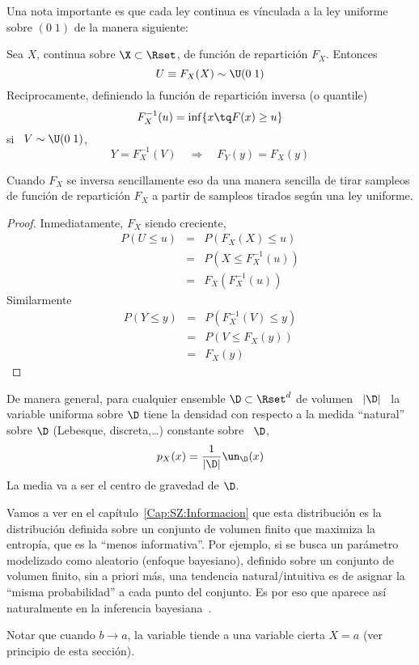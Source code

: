 Una nota  importante es que cada ley  continua es v\'inculada a  la ley uniforme
sobre $(0 \; 1)$ de la manera siguiente:
%
\begin{lema}[Inversi\'on]\label{Lem:MP:InversionUniforme}
Sea $X$, continua sobre $\X \subset \Rset$, de funci\'on de repartici\'on $F_X$. Entonces
%
\[
U \equiv F_X(X) \sim \U(0 \; 1)
\]
%
Reciprocamente, definiendo la funci\'on de repartici\'on inversa (o quantile)
%
\[
F_X^{-1}(u) = \inf \{ x \tq F(x) \ge u \}
\]
%
si \ $V \sim \U( 0 \; 1 )$,
%
\[
Y = F_X^{-1}(V) \quad \Rightarrow \quad F_Y(y) = F_X(y)
\]
\end{lema}
%
Cuando  $F_X$ se  inversa  sencillamente eso  da  una manera  sencilla de  tirar
sampleos de funci\'on de repartici\'on $F_X$ a partir de sampleos tirados seg\'un
una ley uniforme.
%
\begin{proof}
Inmediatamente, $F_X$ siendo creciente,
%
\begin{eqnarray*}
P(U \le u) & = &  P( F_X(X) \le u)\\[2mm]
%
& = & P(X \le F_X^{-1}(u))\\[2mm]
%
& = & F_X\left( F_X^{-1} (u) \right)
\end{eqnarray*}
%
Similarmente
%
\begin{eqnarray*}
P(Y \le y) & = &  P( F_X^{-1}(V) \le y)\\[2mm]
%
& = & P(V \le F_X(y))\\[2mm]
%
& = & F_X(y)
\end{eqnarray*}
%
\end{proof}

De manera  general, para  cualquier ensemble $\D  \subset \Rset^d$ de  volumen \
$|\D|$ \,  la variable uniforma sobre $\D$  tiene la densidad con  respecto a la
medida  ``natural'' sobre  $\D$  (Lebesque, discreta,\ldots)  constante sobre  \
$\D$,
%
\[
p_X(x) = \frac{1}{|\D|} \un_{\D}(x)
\]
%
La media va a ser el centro de gravedad de $\D$.

Vamos a ver en el cap\'itulo~\ref{Cap:SZ:Informacion} que esta distribuci\'on es
la distribuci\'on definida  sobre un conjunto de volumen  finito que maximiza la
entrop\'ia, \ie  que es la  ``menos informativa''. Por  ejemplo, si se  busca un
par\'ametro  modelizado como  aleatorio (enfoque  bayesiano), definido  sobre un
conjunto de volumen finito, sin  a priori m\'as, una tendencia natural/intuitiva
es de  asignar la ``misma probabilidad'' a  cada punto del conjunto.  Es por eso
que aparece as\'i naturalmente en la inferencia bayesiana~\cite{Rob07}.
 
Notar que  cuando $b \to a$,  la variable tiende a  una variable cierta  $X = a$
(ver principio de esta secci\'on).
